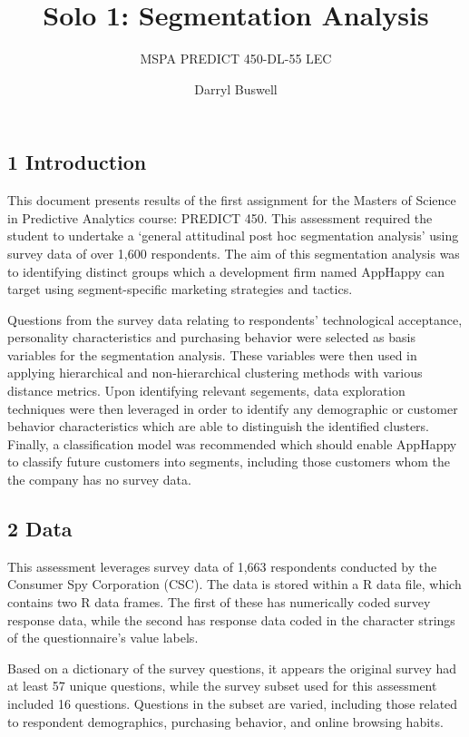 \documentclass[]{article}
\title{Solo 1: Segmentation Analysis}
\subtitle{MSPA PREDICT 450-DL-55 LEC}
\author{Darryl Buswell}
\date{}
\begin{document}
\maketitle

\subsection{1 Introduction}\label{introduction}

This document presents results of the first assignment for the Masters
of Science in Predictive Analytics course: PREDICT 450. This assessment
required the student to undertake a `general attitudinal post hoc
segmentation analysis' using survey data of over 1,600 respondents. The
aim of this segmentation analysis was to identifying distinct groups
which a development firm named AppHappy can target using
segment-specific marketing strategies and tactics.

Questions from the survey data relating to respondents' technological
acceptance, personality characteristics and purchasing behavior were
selected as basis variables for the segmentation analysis. These
variables were then used in applying hierarchical and non-hierarchical
clustering methods with various distance metrics. Upon identifying
relevant segements, data exploration techniques were then leveraged in
order to identify any demographic or customer behavior characteristics
which are able to distinguish the identified clusters. Finally, a
classification model was recommended which should enable AppHappy to
classify future customers into segments, including those customers whom
the the company has no survey data.

\subsection{2 Data}\label{data}

This assessment leverages survey data of 1,663 respondents conducted by
the Consumer Spy Corporation (CSC). The data is stored within a R data
file, which contains two R data frames. The first of these has
numerically coded survey response data, while the second has response
data coded in the character strings of the questionnaire's value labels.

Based on a dictionary of the survey questions, it appears the original
survey had at least 57 unique questions, while the survey subset used
for this assessment included 16 questions. Questions in the subset are
varied, including those related to respondent demographics, purchasing
behavior, and online browsing habits.
\end{document}
